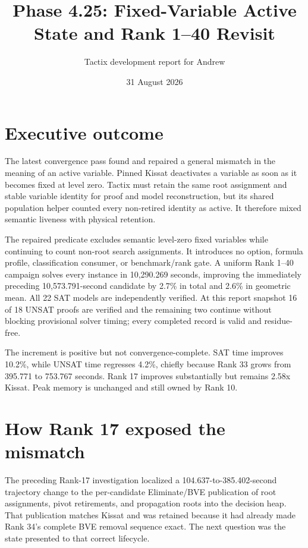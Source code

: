 \documentclass[11pt]{article}
\title{Phase 4.25: Fixed-Variable Active State and Rank 1--40 Revisit}
\author{Tactix development report for Andrew}
\date{31 August 2026}
\begin{document}
\maketitle

\section{Executive outcome}

The latest convergence pass found and repaired a general mismatch in the
meaning of an active variable.  Pinned Kissat deactivates a variable as soon
as it becomes fixed at level zero.  Tactix must retain the same root assignment
and stable variable identity for proof and model reconstruction, but its shared
population helper counted every non-retired identity as active.  It therefore
mixed semantic liveness with physical retention.

The repaired predicate excludes semantic level-zero fixed variables while
continuing to count non-root search assignments.  It introduces no option,
formula profile, classification consumer, or benchmark/rank gate.  A uniform
Rank 1--40 campaign solves every instance in 10,290.269 seconds, improving the
immediately preceding 10,573.791-second candidate by 2.7\% in total and 2.6\%
in geometric mean.  All 22 SAT models are independently verified.  At this
report snapshot 16 of 18 UNSAT proofs are verified and the remaining two
continue without blocking provisional solver timing; every completed record
is valid and residue-free.

The increment is positive but not convergence-complete.  SAT time improves
10.2\%, while UNSAT time regresses 4.2\%, chiefly because Rank 33 grows from
395.771 to 753.767 seconds.  Rank 17 improves substantially but remains 2.58x
Kissat.  Peak memory is unchanged and still owned by Rank 10.

\section{How Rank 17 exposed the mismatch}

The preceding Rank-17 investigation localized a 104.637-to-385.402-second
trajectory change to the per-candidate Eliminate/BVE publication of root
assignments, pivot retirements, and propagation roots into the decision heap.
That publication matches Kissat and was retained because it had already made
Rank 34's complete BVE removal sequence exact.  The next question was the state
presented to that correct lifecycle.
\end{document}
